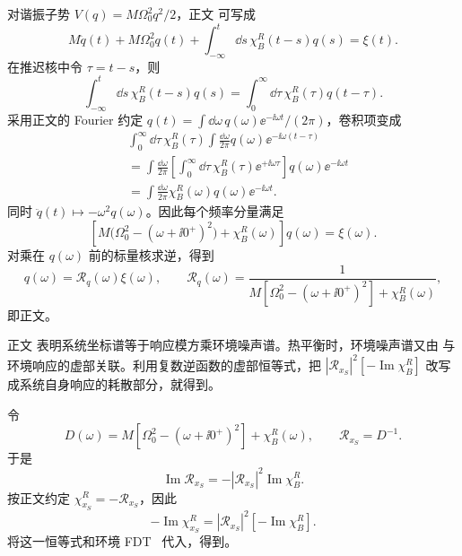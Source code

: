 \begin{derivation}[环境耦合谐振子的推迟响应]
对谐振子势 $V(q)=M\Omega_0^2q^2/2$，正文 可写成
\[
M\ddot q(t)+M\Omega_0^2q(t)
+\int_{-\infty}^{t}\dd s\,\chi_B^R(t-s)q(s)
=\xi(t).
\]
在推迟核中令 $\tau=t-s$，则
\[
\int_{-\infty}^{t}\dd s\,\chi_B^R(t-s)q(s)
=\int_0^\infty\dd\tau\,\chi_B^R(\tau)q(t-\tau).
\]
采用正文的 Fourier 约定
$q(t)=\int \dd\omega\,q(\omega)\ee^{-\ii\omega t}/(2\pi)$，卷积项变成
\begin{align*}
&\int_0^\infty\dd\tau\,\chi_B^R(\tau)
\int\frac{\dd\omega}{2\pi}q(\omega)
\ee^{-\ii\omega(t-\tau)}\\
&=\int\frac{\dd\omega}{2\pi}
\left[
\int_0^\infty\dd\tau\,
\chi_B^R(\tau)\ee^{+\ii\omega\tau}
\right]q(\omega)\ee^{-\ii\omega t}\\
&=\int\frac{\dd\omega}{2\pi}
\chi_B^R(\omega)q(\omega)\ee^{-\ii\omega t}.
\end{align*}
同时 $\ddot q(t)\mapsto-\omega^2q(\omega)$。因此每个频率分量满足
\[
\left[
M\bigl(\Omega_0^2-(\omega+\ii0^+)^2\bigr)
+\chi_B^R(\omega)
\right]q(\omega)=\xi(\omega).
\]
对乘在 $q(\omega)$ 前的标量核求逆，得到
\[
q(\omega)=\mathcal R_q(\omega)\xi(\omega),
\qquad
\mathcal R_q(\omega)
=\frac{1}{M[\Omega_0^2-(\omega+\ii0^+)^2]+\chi_B^R(\omega)},
\]
即正文。
\end{derivation}

\begin{derivation}[环境涨落与系统坐标谱]

正文 表明系统坐标谱等于响应模方乘环境噪声谱。热平衡时，环境噪声谱又由 与环境响应的虚部关联。利用复数逆函数的虚部恒等式，把 $|\mathcal R_{x_S}|^2[-\operatorname{Im}\chi_B^R]$ 改写成系统自身响应的耗散部分，就得到。

令
\[
D(\omega)=M[\Omega_0^2-(\omega+\ii0^+)^2]+\chi_B^R(\omega),
\qquad
\mathcal R_{x_S}=D^{-1}.
\]
于是
\[
\operatorname{Im}\mathcal R_{x_S}
=-|\mathcal R_{x_S}|^2\operatorname{Im}\chi_B^R.
\]
按正文约定 $\chi_{x_S}^R=-\mathcal R_{x_S}$，因此
\[
-\operatorname{Im}\chi_{x_S}^R
=|\mathcal R_{x_S}|^2[-\operatorname{Im}\chi_B^R].
\]
将这一恒等式和环境 FDT~ 代入，得到。
\end{derivation}



